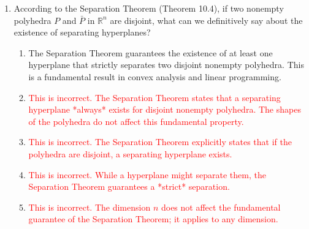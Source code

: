 \documentclass{article}%
\newcommand{\incorrect}[1]{\textcolor{red}{#1}}
\begin{document}
\begin{enumerate}
\begin{enumerate}
\item \incorrect{The Separation Theorem is directly relevant to linear programming duality. It provides a geometric interpretation of the relationship between the feasible regions of the primal and dual problems and helps explain strong duality.}%
\item \incorrect{While the statement about infeasibility and unboundedness is related to duality, it's not a direct consequence of the Separation Theorem. The Separation Theorem deals with the separation of feasible regions, not the implications of infeasibility.}%
\item \incorrect{The Separation Theorem doesn't directly guarantee that if the primal is feasible and bounded, the dual is also.  It deals with the separation of feasible regions when they are disjoint. Strong duality is a consequence of other theorems, not the Separation Theorem alone.}%
\item \incorrect{The Separation Theorem applies to convex sets of any dimension, including those defined by multiple constraints in linear programming problems.}%
\end{enumerate}%
\vspace{1em}%
\item According to the Separation Theorem (Theorem 10.4), if two nonempty polyhedra $P$ and $\bar{P}$ in $\mathbb{R}^n$ are disjoint, what can we definitively say about the existence of separating hyperplanes?%
\begin{enumerate}%
\item The Separation Theorem guarantees the existence of at least one hyperplane that strictly separates two disjoint nonempty polyhedra.  This is a fundamental result in convex analysis and linear programming.%
\item \incorrect{This is incorrect. The Separation Theorem states that a separating hyperplane *always* exists for disjoint nonempty polyhedra. The shapes of the polyhedra do not affect this fundamental property.}%
\item \incorrect{This is incorrect. The Separation Theorem explicitly states that if the polyhedra are disjoint, a separating hyperplane exists.}%
\item \incorrect{This is incorrect. While a hyperplane might separate them, the Separation Theorem guarantees a *strict* separation.}%
\item \incorrect{This is incorrect. The dimension $n$ does not affect the fundamental guarantee of the Separation Theorem; it applies to any dimension.}%

\end{enumerate}
\end{enumerate}
\end{document}
